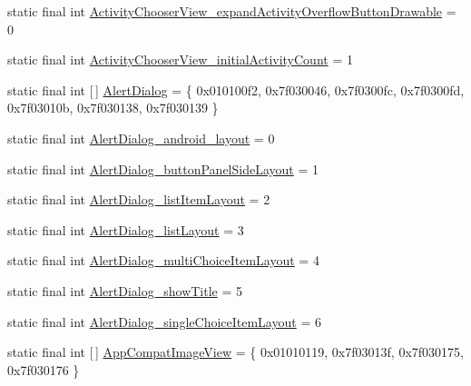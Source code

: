\begin{DoxyCompactItemize}
static final int \mbox{\hyperlink{classandroid_1_1support_1_1v7_1_1appcompat_1_1R_1_1styleable_a57d782294bc85a6841b5827f7d22e221}{Activity\+Chooser\+View\+\_\+expand\+Activity\+Overflow\+Button\+Drawable}} = 0
\item 
static final int \mbox{\hyperlink{classandroid_1_1support_1_1v7_1_1appcompat_1_1R_1_1styleable_af5fce8154e0c1de563d94e6b59316ea8}{Activity\+Chooser\+View\+\_\+initial\+Activity\+Count}} = 1
\item 
static final int \mbox{[}$\,$\mbox{]} \mbox{\hyperlink{classandroid_1_1support_1_1v7_1_1appcompat_1_1R_1_1styleable_a52dcd4f818920ef336f5b8033a2b34c1}{Alert\+Dialog}} = \{ 0x010100f2, 0x7f030046, 0x7f0300fc, 0x7f0300fd, 0x7f03010b, 0x7f030138, 0x7f030139 \}
\item 
static final int \mbox{\hyperlink{classandroid_1_1support_1_1v7_1_1appcompat_1_1R_1_1styleable_a3ba92cfe097b7f2eb3bf09db564da66a}{Alert\+Dialog\+\_\+android\+\_\+layout}} = 0
\item 
static final int \mbox{\hyperlink{classandroid_1_1support_1_1v7_1_1appcompat_1_1R_1_1styleable_ac6cb6a756969c7cd5147564f0e743131}{Alert\+Dialog\+\_\+button\+Panel\+Side\+Layout}} = 1
\item 
static final int \mbox{\hyperlink{classandroid_1_1support_1_1v7_1_1appcompat_1_1R_1_1styleable_a3d97cbf99f764229526d22f3c734187e}{Alert\+Dialog\+\_\+list\+Item\+Layout}} = 2
\item 
static final int \mbox{\hyperlink{classandroid_1_1support_1_1v7_1_1appcompat_1_1R_1_1styleable_afb0edb41ca6aa8279e7047879a7e31ba}{Alert\+Dialog\+\_\+list\+Layout}} = 3
\item 
static final int \mbox{\hyperlink{classandroid_1_1support_1_1v7_1_1appcompat_1_1R_1_1styleable_ae1e8a669920f8a567b5f718033319753}{Alert\+Dialog\+\_\+multi\+Choice\+Item\+Layout}} = 4
\item 
static final int \mbox{\hyperlink{classandroid_1_1support_1_1v7_1_1appcompat_1_1R_1_1styleable_a0c73c72de42446c024b882c15590bd62}{Alert\+Dialog\+\_\+show\+Title}} = 5
\item 
static final int \mbox{\hyperlink{classandroid_1_1support_1_1v7_1_1appcompat_1_1R_1_1styleable_a9e188e09ee3e99d0885738d1480b0d1e}{Alert\+Dialog\+\_\+single\+Choice\+Item\+Layout}} = 6
\item 
static final int \mbox{[}$\,$\mbox{]} \mbox{\hyperlink{classandroid_1_1support_1_1v7_1_1appcompat_1_1R_1_1styleable_a8d637497c66d3f24c82211c9ec73a3d9}{App\+Compat\+Image\+View}} = \{ 0x01010119, 0x7f03013f, 0x7f030175, 0x7f030176 \}
\item 

\end{DoxyCompactItemize}
